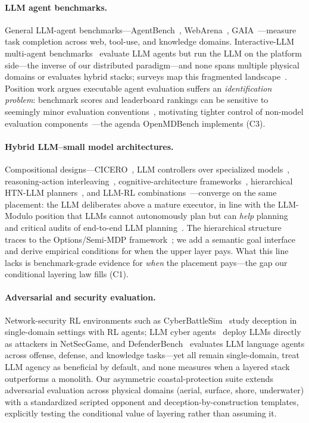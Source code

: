 \documentclass[sigconf,anonymous]{aamas}
\begin{document}
\paragraph{LLM agent benchmarks.}
General LLM-agent benchmarks---AgentBench~\cite{agentbench}, WebArena~\cite{webarena}, GAIA~\cite{gaia}---measure task completion across web, tool-use, and knowledge domains. Interactive-LLM multi-agent benchmarks~\cite{llmarena,multiagentbench,mindagent,decrypto,spinbench} evaluate LLM agents but run the LLM on the platform side---the inverse of our distributed paradigm---and none spans multiple physical domains or evaluates hybrid stacks; surveys map this fragmented landscape~\cite{llmagentsurvey25}. Position work argues executable agent evaluation suffers an \emph{identification problem}: benchmark scores and leaderboard rankings can be sensitive to seemingly minor evaluation conventions~\cite{whenbenchtargets}, motivating tighter control of non-model evaluation components~\cite{whenbenchtargets}---the agenda OpenMDBench implements (C3).

\paragraph{Hybrid LLM--small model architectures.}
Compositional designs---CICERO~\cite{cicero22}, LLM controllers over specialized models~\cite{hugginggpt23}, reasoning-action interleaving~\cite{react}, cognitive-architecture frameworks~\cite{coala}, hierarchical HTN-LLM planners~\cite{chathtn25}, and LLM-RL combinations~\cite{lamarl,lgcmarl,l2m2,reflectivellm}---converge on the same placement: the LLM deliberates above a mature executor, in line with the LLM-Modulo position that LLMs cannot autonomously plan but can \emph{help} planning~\cite{kambhampati24} and critical audits of end-to-end LLM planning~\cite{valmeekam23}. The hierarchical structure traces to the Options/Semi-MDP framework~\cite{sutton99}; we add a semantic goal interface and derive empirical conditions for when the upper layer pays. What this line lacks is benchmark-grade evidence for \emph{when} the placement pays---the gap our conditional layering law fills (C1).

\paragraph{Adversarial and security evaluation.}
Network-security RL environments such as CyberBattleSim~\cite{cyberbattlesim} study deception in single-domain settings with RL agents; LLM cyber agents~\cite{rigaki23} deploy LLMs directly as attackers in NetSecGame, and DefenderBench~\cite{defenderbench} evaluates LLM language agents across offense, defense, and knowledge tasks---yet all remain single-domain, treat LLM agency as beneficial by default, and none measures when a layered stack outperforms a monolith. Our asymmetric coastal-protection suite extends adversarial evaluation across physical domains (aerial, surface, shore, underwater) with a standardized scripted opponent and deception-by-construction templates, explicitly testing the conditional value of layering rather than assuming it.
\end{document}
